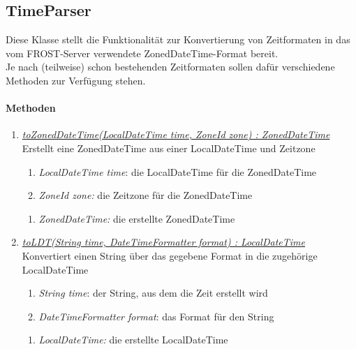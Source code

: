 \subsection*{TimeParser}\label{timeParser}

Diese Klasse stellt die Funktionalität zur Konvertierung von Zeitformaten in das vom FROST-Server verwendete ZonedDateTime-Format bereit. \\
Je nach (teilweise) schon bestehenden Zeitformaten sollen dafür verschiedene Methoden zur Verfügung stehen.


\paragraph{Methoden}
\begin{enumerate}[+]
	
	\item \underline{\textit{toZonedDateTime(LocalDateTime time, ZoneId zone) : ZonedDateTime}}\\
	Erstellt eine ZonedDateTime aus einer LocalDateTime und Zeitzone
	\begin{enumerate}[$\bullet$]
		\item \textit{LocalDateTime time}: die LocalDateTime für die ZonedDateTime
		\item \textit{ZoneId zone:} die Zeitzone für die ZonedDateTime
	\end{enumerate}
	\vspace{-0.2cm}
	\begin{enumerate}[$\circ$]
		\item \textit{ZonedDateTime:} die erstellte ZonedDateTime
	\end{enumerate}
	
	\item \underline{\textit{toLDT(String time, DateTimeFormatter format) : LocalDateTime}}\\
	Konvertiert einen String über das gegebene Format in die zugehörige LocalDateTime
	\begin{enumerate}[$\bullet$]
		\item \textit{String time}: der String, aus dem die Zeit erstellt wird
		\item \textit{DateTimeFormatter format}: das Format für den String
	\end{enumerate}
	\vspace{-0.2cm}
	\begin{enumerate}[$\circ$]
		\item \textit{LocalDateTime:} die erstellte LocalDateTime
	\end{enumerate}
	

\end{enumerate}
